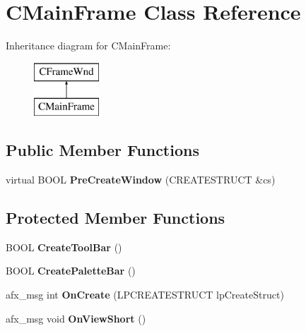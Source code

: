 \hypertarget{class_c_main_frame}{}\section{C\+Main\+Frame Class Reference}
\label{class_c_main_frame}
Inheritance diagram for C\+Main\+Frame\+:\begin{figure}[H]
\begin{center}
\leavevmode
\includegraphics[height=2.000000cm]{class_c_main_frame}
\end{center}
\end{figure}
\subsection*{Public Member Functions}
\begin{DoxyCompactItemize}
\item 
\mbox{\label{class_c_main_frame_a549bf677c955c2898c3c683321633c16}} 
virtual B\+O\+OL {\bfseries Pre\+Create\+Window} (C\+R\+E\+A\+T\+E\+S\+T\+R\+U\+CT \&cs)
\end{DoxyCompactItemize}
\subsection*{Protected Member Functions}
\begin{DoxyCompactItemize}
\item 
\mbox{\label{class_c_main_frame_ad5edd671a359b7958eaf78916fa69a42}} 
B\+O\+OL {\bfseries Create\+Tool\+Bar} ()
\item 
\mbox{\label{class_c_main_frame_a31e574e7c7f60aa3fea901c8f81e69ec}} 
B\+O\+OL {\bfseries Create\+Palette\+Bar} ()
\item 
\mbox{\label{class_c_main_frame_a48666466fd37412fcaeff75c3b12e0ed}} 
afx\+\_\+msg int {\bfseries On\+Create} (L\+P\+C\+R\+E\+A\+T\+E\+S\+T\+R\+U\+CT lp\+Create\+Struct)
\item 
\mbox{\label{class_c_main_frame_acc76d5562454352a0e51c0894c1dfa07}} 
afx\+\_\+msg void {\bfseries On\+View\+Short} ()
\end{DoxyCompactItemize}
